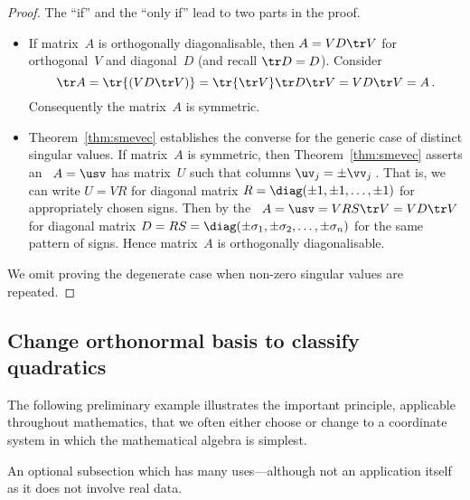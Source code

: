 \begin{proof} 
The ``if'' and the ``only if'' lead to two parts in the proof.
\begin{itemize}
\item If matrix~\(A\) is orthogonally diagonalisable, then \(A=VD\tr V\) for orthogonal~\(V\) and diagonal~\(D\) (and recall \(\tr D=D\)).
Consider
\begin{equation*}
\tr A=\tr{(VD\tr V)}
=\tr{{\tr V}}\tr D\tr V
=VD\tr V=A\,.
\end{equation*}
Consequently the matrix~\(A\) is symmetric.

\item Theorem~\ref{thm:smevec} establishes the converse for the generic case of distinct singular values.
If matrix~\(A\) is symmetric, then Theorem~\ref{thm:smevec} asserts an \svd\ \(A=\usv\) has matrix~\(U\) such that columns \(\uv_j=\pm\vv_j\)\,.
That is, we can write \(U=VR\) for diagonal matrix \(R=\diag(\pm1,\pm1,\ldots,\pm1)\) for appropriately chosen signs.
Then by the \svd\ \(A=\usv=VRS\tr V=VD\tr V\) for diagonal matrix \(D=RS=\diag(\pm\sigma_1,\pm\sigma_2,\ldots,\pm\sigma_n)\) for the same pattern of signs.
Hence matrix~\(A\) is orthogonally diagonalisable.
\end{itemize}
We omit proving the degenerate case when non-zero singular values are repeated.
\end{proof}

\begin{comment}
Further material could include the following---maybe exercises.
For every \idx{symmetric matrix}, \(A^k=VD^k\tr V\).
Also, every \idx{square matrix} has a \idx{polar decomposition} \(A=RQ\) for symmetric positive semi-definite~\(R\) and orthogonal~\(Q\) (since \(A=\usv=(US\tr U)(U\tr V)\)) \pooliv{p.610}.  
\cite{Higham86} mentions applications to the Orthogonal Procrustes problem (perhaps in approx matrices), Aerospace, Optimisation, Matrix square root, but these look too hard for this level.
\end{comment}







\subsection{Change orthonormal basis to classify quadratics}
\label{sec:cobcqs}


The following preliminary example illustrates the important principle, 
applicable throughout mathematics, that we often either choose or change to a coordinate system in which the mathematical algebra is simplest.
\begin{aside}
An optional subsection which has many uses---although not an application itself as it does not involve real data.
\end{aside}



